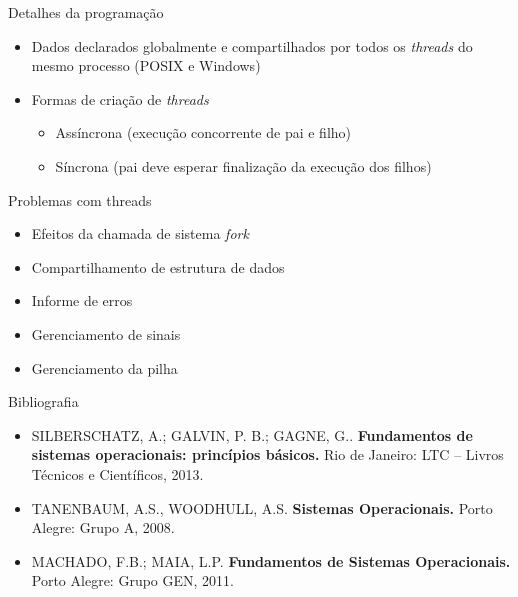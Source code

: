 \documentclass[aspectratio=169,
				xcolor=table]{beamer}
\begin{document}
	\begin{frame}{Detalhes da programação}
		\begin{itemize}
			\item Dados declarados globalmente e compartilhados por todos os \textit{threads} do mesmo processo (POSIX e Windows)
			\item Formas de criação de \textit{threads}
			\begin{itemize}
				\item Assíncrona (execução concorrente de pai e filho)
				\item Síncrona (pai deve esperar finalização da execução dos filhos)
			\end{itemize}			
		\end{itemize}		
	\end{frame}
	
	\begin{frame}{Problemas com threads}
		\begin{itemize}
			\item Efeitos da chamada de sistema \textit{fork}
			\item Compartilhamento de estrutura de dados
			\item Informe de erros
			\item Gerenciamento de sinais
			\item Gerenciamento da pilha
		\end{itemize}
		
	\end{frame}
	
	\begin{frame}{Bibliografia}
		\begin{itemize}
			\item SILBERSCHATZ, A.; GALVIN, P. B.; GAGNE, G.. \textbf{Fundamentos de sistemas operacionais: princípios básicos.} Rio de Janeiro: LTC – Livros Técnicos e Científicos, 2013.
			
			\vspace{1em}

			\item TANENBAUM, A.S., WOODHULL, A.S. \textbf{Sistemas Operacionais.} Porto Alegre: Grupo A, 2008.
			
			\vspace{1em}
			
			\item MACHADO, F.B.; MAIA, L.P. \textbf{Fundamentos de Sistemas Operacionais.} Porto Alegre: Grupo GEN, 2011.
		\end{itemize}
	\end{frame}


	\begin{frame}{}
	\end{frame}	
	
\end{document}
